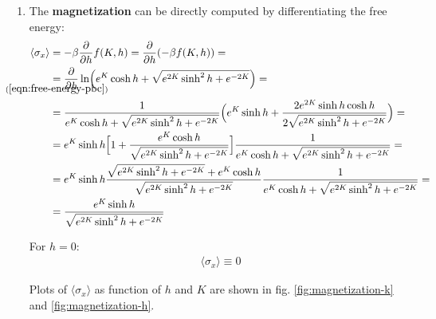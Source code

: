 \documentclass[12pt,a4paper]{report}
\begin{document}
\begin{enumerate}
        \item The \textbf{magnetization} can be directly computed by differentiating the free energy:
        \begin{align} \nonumber
            \langle \sigma_x \rangle &= - \beta \pdv{h} f(K,h) = \pdv{h} (-\beta f(K,h)) = \\ \nonumber
            &\underset{\mathclap{(\ref{eqn:free-energy-pbc})}}{=} \pdv{h} \ln (e^K \cosh h + \sqrt{e^{2K} \sinh^2 h + e^{-2K}}) =\\ \nonumber
            &= \frac{1}{e^K \cosh h + \sqrt{e^{2K} \sinh^2 h + e^{-2K}}} \Big(e^K \sinh h + \frac{2 e^{2K} \sinh h \cosh h}{2 \sqrt{e^{2K} \sinh^2 h + e^{-2K}}}  \Big) =\\ \nonumber
            &= e^K \sinh h \Big[1 + \frac{e^K \cosh h}{\sqrt{e^{2K} \sinh^2 h + e^{-2K}}} \Big] \frac{1}{e^K \cosh h + \sqrt{e^{2K} \sinh^2 h + e^{-2K}}} =\\ \nonumber
            &= e^K \sinh h \frac{\sqrt{e^{2K} \sinh^2 h + e^{-2K}} + e^K \cosh h}{\sqrt{e^{2K} \sinh^2 h + e^{-2K}}} \frac{1}{e^K \cosh h + \sqrt{e^{2K} \sinh^2 h + e^{-2K}}} =\\ 
            &= \frac{e^K \sinh h}{\sqrt{e^{2K} \sinh^2 h + e^{-2K}}} \label{eqn:magnetization-pbc-full}
        \end{align} 

        For $h=0$:
        \begin{align*}
            \langle \sigma_x \rangle \equiv 0
        \end{align*}

        Plots of $\langle \sigma_x \rangle$ as function of $h$ and $K$ are shown in fig. \ref{fig:magnetization-k} and \ref{fig:magnetization-h}.

        \medskip


\end{enumerate}
\end{document}
